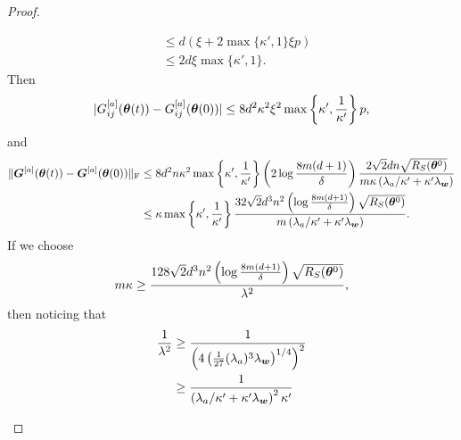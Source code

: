 \documentclass{article}
\begin{document}
\begin{proof}
\begin{enumerate}[(a)]
\begin{enumerate}[(i)]
\begin{equation}
\begin{aligned}
                                 & \leq d\left(\xi+2\max\{\kappa',1\}\xi p\right)                                    \\
                                 & \leq 2d\xi\max\{\kappa',1\}.
                            \end{aligned}
                        \end{equation}
                        Then
                        \begin{equation}
                            \lvert G_{ij}^{[a]}(\bm{\theta}(t)) - G_{ij}^{[a]}(\bm{\theta}(0))\rvert \leq 8d^2\kappa^2\xi^2\max\left\{\kappa',\frac{1}{\kappa'}\right\}p,
                        \end{equation}
                        and
                        \begin{equation}
                            \begin{aligned}
                                \lVert\bm{G}^{[a]}(\bm{\theta}(t)) - \bm{G}^{[a]}(\bm{\theta}(0))\rVert_\mathrm{F}
                                 & \leq 8d^2n\kappa^2\max\left\{\kappa',\frac{1}{\kappa'}\right\}\left(2\log\frac{8m(d+1)}{\delta}\right)\frac{2\sqrt{2}dn\sqrt{R_S(\bm{\theta}^0)}}{m\kappa\left(\lambda_a/\kappa'+\kappa'\lambda_{\bm{w}}\right)} \\
                                 & \leq\kappa\max\left\{\kappa',\frac{1}{\kappa'}\right\}\frac{32\sqrt{2}d^3n^2\left(\log\frac{8m(d+1)}{\delta}\right)\sqrt{R_S(\bm{\theta}^0)}}{m\left(\lambda_a/\kappa'+\kappa'\lambda_{\bm{w}}\right)}.
                            \end{aligned}
                        \end{equation}
                        If we choose
                        \begin{equation}\label{cond:m1}
                            m\kappa\geq\frac{128\sqrt{2}d^3n^2\left(\log\frac{8m(d+1)}{\delta}\right)\sqrt{R_S(\bm{\theta}^0)}}{\lambda^2},
                        \end{equation}
                        then noticing that
                        \begin{equation}
                            \begin{aligned}
                                \frac{1}{\lambda^2}
                                 & \geq\frac{1}{\left(4\left(\frac{1}{27}(\lambda_a)^3\lambda_{\vw}\right)^{1/4}\right) ^2} \\
                                 & \geq\frac{1}{\left(\lambda_a/\kappa'+\kappa'\lambda_{\vw}\right)^2\kappa'}               \\

\end{aligned}
\end{equation}
\end{enumerate}
\end{enumerate}
\end{proof}
\end{document}
